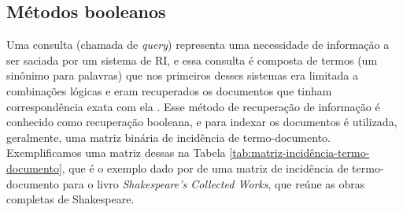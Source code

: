 \subsection{Métodos booleanos} \label{subsec:MétodosBooleanos}

    Uma consulta (chamada de \textit{query}) representa uma necessidade de informação a ser saciada por um sistema de RI, e essa consulta é composta de termos (um sinônimo para palavras) que nos primeiros desses sistemas era limitada a combinações lógicas e eram recuperados os documentos que tinham correspondência exata com ela \cite[p.~1446]{Sanderson2012THIRR}. 
    Esse método de recuperação de informação é conhecido como recuperação booleana, e para indexar os documentos é utilizada, geralmente, uma matriz binária de incidência de termo-documento. 
    Exemplificamos uma matriz dessas na Tabela \ref{tab:matriz-incidência-termo-documento}, que é o exemplo dado por  de uma matriz de incidência de termo-documento para o livro \textit{Shakespeare’s Collected Works}, que reúne as obras completas de Shakespeare.

    
